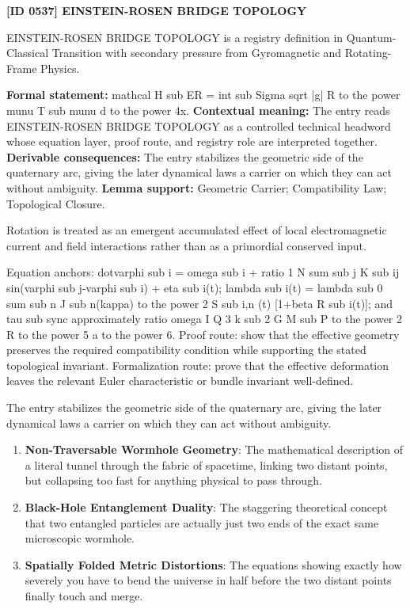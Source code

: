 \clearpage
\noindent\textbf{[ID 0537] EINSTEIN-ROSEN BRIDGE TOPOLOGY}\par
\vspace{0.35em}
\begingroup\small
{}
EINSTEIN-ROSEN BRIDGE TOPOLOGY is a registry definition in Quantum-Classical Transition with secondary pressure from Gyromagnetic and Rotating-Frame Physics.

\begingroup\footnotesize\setlength{\emergencystretch}{3em}\sloppy
\textbf{Formal statement:} mathcal H sub ER = int sub Sigma sqrt |g| R to the power munu T sub munu d to the power 4x. \textbf{Contextual meaning:} The entry reads EINSTEIN-ROSEN BRIDGE TOPOLOGY as a controlled technical headword whose equation layer, proof route, and registry role are interpreted together. \textbf{Derivable consequences:} The entry stabilizes the geometric side of the quaternary arc, giving the later dynamical laws a carrier on which they can act without ambiguity. \textbf{Lemma support:} Geometric Carrier; Compatibility Law; Topological Closure.\par
\endgroup

Rotation is treated as an emergent accumulated effect of local electromagnetic current and field interactions rather than as a primordial conserved input.

Equation anchors: dotvarphi sub i = omega sub i + ratio 1 N sum sub j K sub ij sin(varphi sub j-varphi sub i) + eta sub i(t); lambda sub i(t) = lambda sub 0 sum sub n J sub n(kappa) to the power 2 S sub i,n (t) [1+beta R sub i(t)]; and tau sub sync approximately ratio omega I Q 3 k sub 2 G M sub P to the power 2 R to the power 5 a to the power 6. Proof route: show that the effective geometry preserves the required compatibility condition while supporting the stated topological invariant. Formalization route: prove that the effective deformation leaves the relevant Euler characteristic or bundle invariant well-defined.

The entry stabilizes the geometric side of the quaternary arc, giving the later dynamical laws a carrier on which they can act without ambiguity.
\endgroup

\begin{enumerate}[leftmargin=1.6em,itemsep=6pt,topsep=4pt]
\item \textbf{Non-Traversable Wormhole Geometry}: The mathematical description of a literal tunnel through the fabric of spacetime, linking two distant points, but collapsing too fast for anything physical to pass through.
\item \textbf{Black-Hole Entanglement Duality}: The staggering theoretical concept that two entangled particles are actually just two ends of the exact same microscopic wormhole.
\item \textbf{Spatially Folded Metric Distortions}: The equations showing exactly how severely you have to bend the universe in half before the two distant points finally touch and merge.
\end{enumerate}

